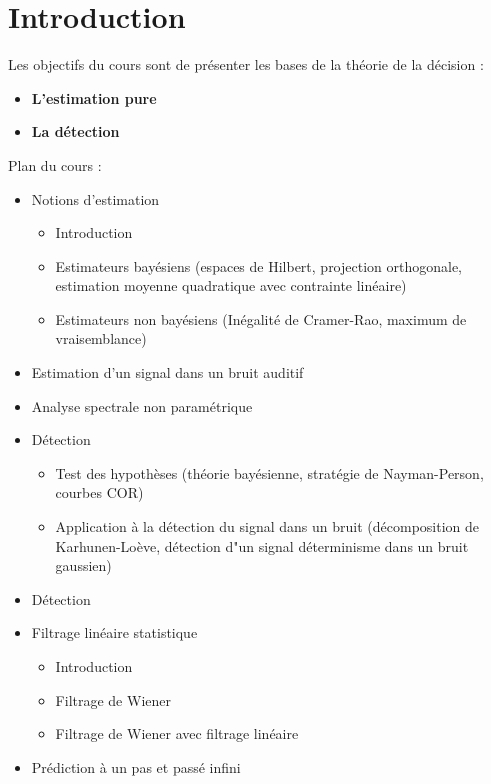 \chapter*{Introduction}
Les objectifs du cours sont de présenter les bases de la théorie de la décision :
\begin{itemize}
    \item \textbf{L'estimation pure}
    \item \textbf{La détection} \newline
\end{itemize}

Plan du cours : \newline
\begin{itemize}
    \item Notions d'estimation
    \begin{itemize}
        \item Introduction
        \item Estimateurs bayésiens (espaces de Hilbert, projection orthogonale, estimation moyenne quadratique  avec contrainte linéaire)
        \item Estimateurs non bayésiens (Inégalité de Cramer-Rao, maximum de vraisemblance)
    \end{itemize}
    \item Estimation d'un signal dans un bruit auditif
    \item Analyse spectrale non paramétrique
    \item Détection
    \begin{itemize}
        \item Test des hypothèses (théorie bayésienne, stratégie de Nayman-Person, courbes COR)
        \item Application à la détection du signal dans un bruit (décomposition de Karhunen-Loève, détection d"un signal déterminisme dans un bruit gaussien)
    \end{itemize}
    \item Détection
    \item Filtrage linéaire statistique
    \begin{itemize}
        \item Introduction
        \item Filtrage de Wiener 
        \item Filtrage de Wiener avec filtrage linéaire
    \end{itemize}
    \item Prédiction à un pas et passé infini
    \begin{itemize}

\end{itemize}
\end{itemize}
